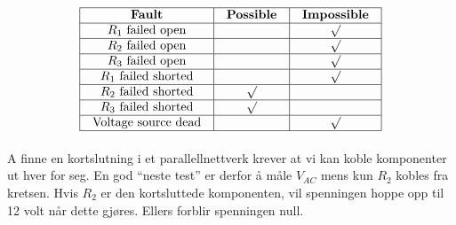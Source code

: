 
$$\vbox{\offinterlineskip
\halign{\strut
\vrule \quad\hfil # \ \hfil & 
\vrule \quad\hfil # \ \hfil & 
\vrule \quad\hfil # \ \hfil \vrule \cr
\noalign{\hrule}
%
{\bf Fault} & {\bf Possible} & {\bf Impossible} \cr
%
\noalign{\hrule}
%
$R_1$ failed open &  & $\surd$ \cr
%
\noalign{\hrule}
%
$R_2$ failed open &  & $\surd$ \cr
%
\noalign{\hrule}
%
$R_3$ failed open &  & $\surd$ \cr
%
\noalign{\hrule}
%
$R_1$ failed shorted &  & $\surd$ \cr
%
\noalign{\hrule}
%
$R_2$ failed shorted & $\surd$ &  \cr
%
\noalign{\hrule}
%
$R_3$ failed shorted & $\surd$ &  \cr
%
\noalign{\hrule}
%
Voltage source dead &  & $\surd$ \cr
%
\noalign{\hrule}
} %
}$$ %

A finne en kortslutning i et parallellnettverk krever at vi kan koble komponenter ut hver for seg.  En god ``neste test'' er derfor å måle $V_{AC}$ mens kun $R_2$ kobles fra kretsen.  Hvis $R_2$ er den kortsluttede komponenten, vil spenningen hoppe opp til 12 volt når dette gjøres.  Ellers forblir spenningen null.


